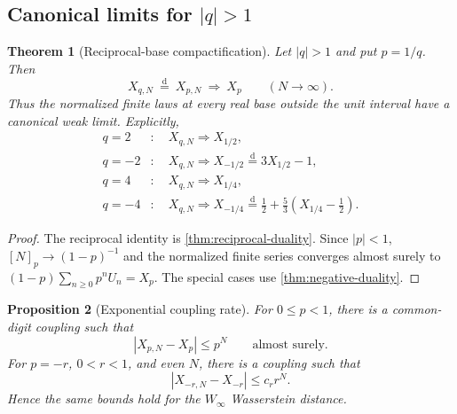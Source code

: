 \documentclass[11pt]{article}
\newtheorem{theorem}{Theorem}[section]
\newtheorem{proposition}[theorem]{Proposition}
\theoremstyle{definition}
\newcommand{\abs}[1]{\left\lvert #1\right\rvert}
\newcommand{\doteqL}{\mathrel{\stackrel{\mathrm d}=}}
\begin{document}
\subsection{Canonical limits for \texorpdfstring{$\lvert q\rvert>1$}{|q|>1}}

\begin{theorem}[Reciprocal-base compactification]\label{thm:outside-limit}
Let \(\lvert q\rvert>1\) and put \(p=1/q\).  Then
\begin{equation}
 X_{q,N}\ \doteqL\ X_{p,N}\ \Longrightarrow\ X_p
 \qquad(N\to\infty).                                     \label{eq:outside-limit}
\end{equation}
Thus the normalized finite laws at every real base outside the unit interval have a
canonical weak limit.  Explicitly,
\begin{align*}
 q=2&:\quad X_{q,N}\Longrightarrow X_{1/2},\\
 q=-2&:\quad X_{q,N}\Longrightarrow X_{-1/2}\doteqL3X_{1/2}-1,\\
 q=4&:\quad X_{q,N}\Longrightarrow X_{1/4},\\
 q=-4&:\quad X_{q,N}\Longrightarrow X_{-1/4}
 \doteqL\frac12+\frac53\left(X_{1/4}-\frac12\right).
\end{align*}
\end{theorem}

\begin{proof}
The reciprocal identity is \cref{thm:reciprocal-duality}.  Since \(\lvert p\rvert<1\),
\([N]_p\to(1-p)^{-1}\) and the normalized finite series converges almost surely to
\((1-p)\sum_{n\ge0}p^nU_n=X_p\).  The special cases use
\cref{thm:negative-duality}.
\end{proof}

\begin{proposition}[Exponential coupling rate]\label{prop:finite-rate}
For \(0\le p<1\), there is a common-digit coupling such that
\begin{equation}
 \abs{X_{p,N}-X_p}\le p^N\qquad\text{almost surely}.      \label{eq:positive-finite-rate}
\end{equation}
For \(p=-r\), \(0<r<1\), and even \(N\), there is a coupling such that
\begin{equation}
 \abs{X_{-r,N}-X_{-r}}\le c_rr^N.                         \label{eq:negative-finite-rate}
\end{equation}
Hence the same bounds hold for the \(W_\infty\) Wasserstein distance.
\end{proposition}
\end{document}
